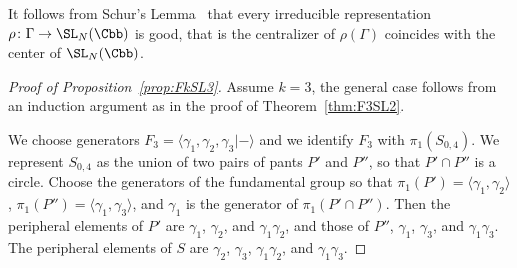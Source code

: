 \begin{rema}\label{Remark:good}
It follows from Schur's Lemma~\cite{FultonHarris} that every irreducible representation $\rho\colon\Gamma\to \SL_N(\Cbb)$ is good, that is the centralizer of $\rho(\Gamma)$ coincides with the center of $\SL_N(\Cbb)$.
\end{rema}



\begin{proof}[Proof of Proposition~\ref{prop:FkSL3}]
Assume $k=3$, the general case follows from an induction argument as in the proof of Theorem~\ref{thm:F3SL2}.

We choose generators $F_3 =\langle \gamma_1,\gamma_2,\gamma_3 |-\rangle$ and we identify $F_3$ with $\pi_1(S_{0,4})$. We represent $S_{0,4}$ as the union of two pairs of pants $P'$ and $P''$, so that $P'\cap P''$ is a circle. Choose the generators of the fundamental group so that $\pi_1 (P')=\langle \gamma_1,\gamma_2 \rangle$, $\pi_1 (P'')=\langle \gamma_1,\gamma_3 \rangle$, and $\gamma_1$ is the generator of $\pi_1(P'\cap P'') $. Then the peripheral elements of $P'$ are $\gamma_1$, $\gamma_2$, and $\gamma_1\gamma_2$, and those of $P''$, $\gamma_1$, $\gamma_3$, and $\gamma_1\gamma_3$. The peripheral elements of $S$ are $\gamma_2$, $\gamma_3$, $\gamma_1\gamma_2$, and $\gamma_1\gamma_3$.



\end{proof}
